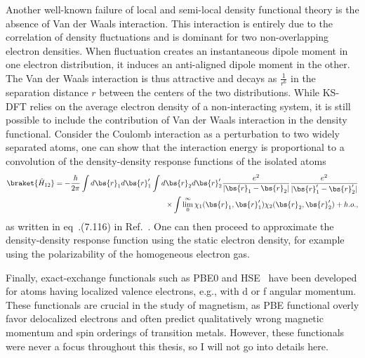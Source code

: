 Another well-known failure of local and semi-local density functional theory is the absence of Van der Waals interaction.
This interaction is entirely due to the correlation of density fluctuations and is dominant for two non-overlapping electron densities.
When fluctuation creates an instantaneous dipole moment in one electron distribution, it induces an anti-aligned dipole moment in the other.
The Van der Waals interaction is thus attractive and decays as $\frac{1}{r^6}$ in the separation distance $r$ between the centers of the two distributions.
While KS-DFT relies on the average electron density of a non-interacting system, it is still possible to include the contribution of Van der Waals interaction in the density functional.
Consider the Coulomb interaction as a perturbation to two widely separated atoms, one can show that the interaction energy is proportional to a convolution of the density-density response functions of the isolated atoms
\begin{align}
\braket{\hat{H}_{12}} = -\dfrac{\hbar}{2\pi}
\int d\bs{r}_1d\bs{r}_1'
\int d\bs{r}_2d\bs{r}_2'
\dfrac{e^2}{\vert\bs{r}_1-\bs{r}_2\vert}
\dfrac{e^2}{\vert\bs{r}_1'-\bs{r}_2'\vert} \nonumber \\
\times\int\lim\limits_0^{\infty}
\chi_1(\bs{r}_1, \bs{r}_1')
\chi_2(\bs{r}_2, \bs{r}_2') + h.o.,
\end{align}
as written in eq~.(7.116) in Ref.~\cite{Giuliani2005}. One can then proceed to approximate the density-density response function using the static electron density, for example using the polarizability of the homogeneous electron gas.

Finally, exact-exchange functionals such as PBE0 and HSE~\cite{Heyd2003} have been developed for atoms having localized valence electrons, e.g., with d or f angular momentum.
These functionals are crucial in the study of magnetism, as PBE functional overly favor delocalized electrons and often predict qualitatively wrong magnetic momentum and spin orderings of transition metals.
However, these functionals were never a focus throughout this thesis, so I will not go into details here.
